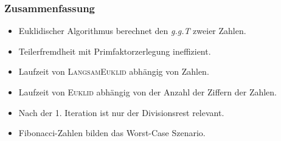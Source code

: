 \documentclass[•]{beamer}
\begin{document}
\begin{frame}
\frametitle{Zusammenfassung}
\begin{itemize}
\item Euklidischer Algorithmus berechnet den \textit{g.g.T} zweier Zahlen.
\item Teilerfremdheit mit Primfaktorzerlegung ineffizient.
\item Laufzeit von \textsc{LangsamEuklid} abh\"angig von Zahlen.
\item Laufzeit von \textsc{Euklid} abh\"angig von der Anzahl der Ziffern der Zahlen.
\item Nach der 1. Iteration ist nur der Divisionsrest relevant.
\item Fibonacci-Zahlen bilden das Worst-Case Szenario.
\end{itemize}
\end{frame}
\end{document}
